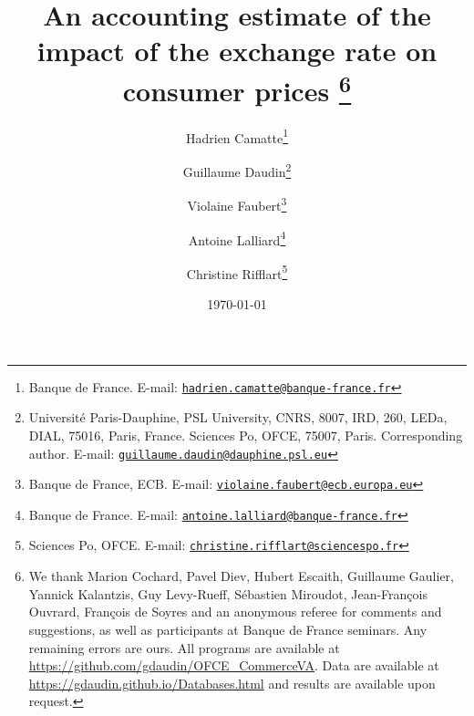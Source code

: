 \documentclass[12pt,a4paper]{paper}
\newcommand{\email}[1]{\href{mailto:#1}{\nolinkurl{#1}}}
\begin{document}
\title{An accounting estimate of the impact of the exchange rate on consumer prices	\thanks{We thank Marion Cochard, Pavel Diev, Hubert Escaith, Guillaume Gaulier, Yannick Kalantzis, Guy Levy-Rueff, Sébastien Miroudot, Jean-François Ouvrard, François de Soyres and an anonymous referee for comments and suggestions, as well as participants at Banque de France seminars. Any remaining errors are ours. All programs are available at \url{https://github.com/gdaudin/OFCE_CommerceVA}. Data are available at \url{https://gdaudin.github.io/Databases.html} and results are available upon request.}\\
\vspace{1cm}
}
\vspace{1cm}
\date{\today}
\author{
	Hadrien Camatte\thanks{Banque de France. E-mail: \email{hadrien.camatte@banque-france.fr}}
	\and
	Guillaume Daudin\thanks{Université Paris-Dauphine, PSL University, CNRS, 8007, IRD, 260, LEDa, DIAL, 75016, Paris, France. Sciences Po, OFCE, 75007, Paris. Corresponding author. E-mail: \email{guillaume.daudin@dauphine.psl.eu}}
	\and
	Violaine Faubert\thanks{Banque de France, ECB. E-mail: \email{violaine.faubert@ecb.europa.eu}}
	\and
	Antoine Lalliard\thanks{Banque de France. E-mail: \email{antoine.lalliard@banque-france.fr}}
	\and
	Christine Rifflart\thanks{Sciences Po, OFCE. E-mail: \email{christine.rifflart@sciencespo.fr}}
}
\maketitle
\end{document}
